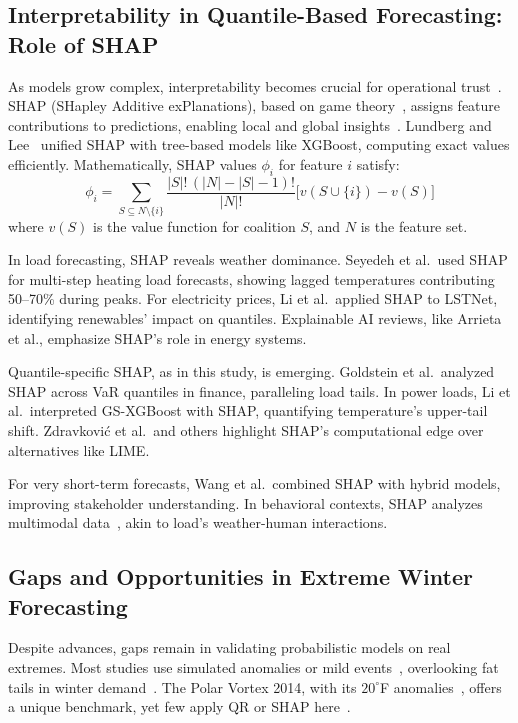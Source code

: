 \documentclass[12pt,a4paper]{article}
\begin{document}
\subsection{Interpretability in Quantile-Based Forecasting: Role of SHAP}

As models grow complex, interpretability becomes crucial for operational trust~\cite{wen2017multi}. SHAP (SHapley Additive exPlanations), based on game theory~\cite{lundberg2017unified}, assigns feature contributions to predictions, enabling local and global insights~\cite{gasthaus2019probabilistic}. Lundberg and Lee~\cite{lundberg2017unified} unified SHAP with tree-based models like XGBoost, computing exact values efficiently. Mathematically, SHAP values $\phi_i$ for feature $i$ satisfy:
\begin{equation}
    \phi_i = \sum_{S \subseteq N \setminus \{i\}} \frac{|S|!\,(|N|-|S|-1)!}{|N|!} \bigl[v(S \cup \{i\}) - v(S)\bigr]
    \label{eq:shap}
\end{equation}
where $v(S)$ is the value function for coalition $S$, and $N$ is the feature set.

In load forecasting, SHAP reveals weather dominance. Seyedeh et al.\ used SHAP for multi-step heating load forecasts, showing lagged temperatures contributing 50--70\% during peaks. For electricity prices, Li et al.\ applied SHAP to LSTNet, identifying renewables' impact on quantiles. Explainable AI reviews, like Arrieta et al., emphasize SHAP's role in energy systems.

Quantile-specific SHAP, as in this study, is emerging. Goldstein et al.\ analyzed SHAP across VaR quantiles in finance, paralleling load tails. In power loads, Li et al.\ interpreted GS-XGBoost with SHAP, quantifying temperature's upper-tail shift. Zdravkovi\'c et al.\ and others highlight SHAP's computational edge over alternatives like LIME.

For very short-term forecasts, Wang et al.\ combined SHAP with hybrid models, improving stakeholder understanding. In behavioral contexts, SHAP analyzes multimodal data~\cite{spiliotis2020are}, akin to load's weather-human interactions.

\subsection{Gaps and Opportunities in Extreme Winter Forecasting}

Despite advances, gaps remain in validating probabilistic models on real extremes. Most studies use simulated anomalies or mild events~\cite{talagala2018meta,bergmeir2018note}, overlooking fat tails in winter demand~\cite{cerqueira2020evaluating}. The Polar Vortex 2014, with its $20^\circ$F anomalies~\cite{kourentzes2014neural}, offers a unique benchmark, yet few apply QR or SHAP here~\cite{petropoulos2022forecasting}.
\end{document}
